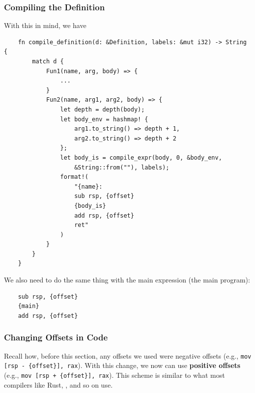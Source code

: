 \documentclass[letterpaper]{article}
\begin{document}
\subsubsection{Compiling the Definition}
With this in mind, we have 
\begin{verbatim}
    fn compile_definition(d: &Definition, labels: &mut i32) -> String {
        match d {
            Fun1(name, arg, body) => {
                ...
            }
            Fun2(name, arg1, arg2, body) => {
                let depth = depth(body);
                let body_env = hashmap! {
                    arg1.to_string() => depth + 1,
                    arg2.to_string() => depth + 2
                };
                let body_is = compile_expr(body, 0, &body_env, 
                    &String::from(""), labels);
                format!(
                    "{name}:
                    sub rsp, {offset}
                    {body_is}
                    add rsp, {offset}
                    ret"
                )
            }
        }
    }\end{verbatim}
We also need to do the same thing with the main expression (the main program):
\begin{verbatim}
    sub rsp, {offset}
    {main}
    add rsp, {offset}\end{verbatim}

\subsubsection{Changing Offsets in Code}
Recall how, before this section, any offsets we used were negative offsets (e.g., \verb|mov [rsp - {offset}], rax|). With this change, we now can use \textbf{positive offsets} (e.g., \verb|mov [rsp + {offset}], rax|). This scheme is similar to what most compilers like Rust, , and so on use. 

\end{document}

